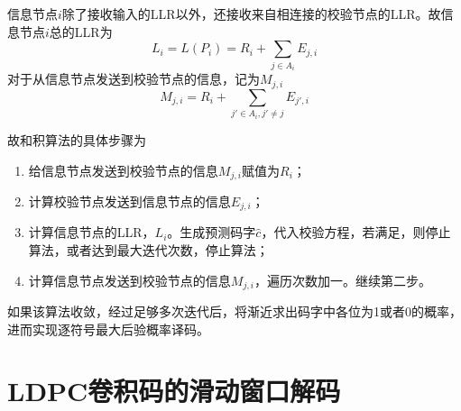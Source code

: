 信息节点$i$除了接收输入的LLR以外，还接收来自相连接的校验节点的LLR。故信息节点$i$总的LLR为
\begin{equation}
L_i = L(P_i) = R_i + \sum_{j\in A_i}E_{j,i}
\end{equation}
对于从信息节点发送到校验节点的信息，记为$M_{j,i}$
\begin{equation}
M_{j,i}= R_i + \sum_{j' \in A_i,j'\neq j}E_{j',i}
\end{equation}

故和积算法的具体步骤为
\begin{enumerate}
\item 给信息节点发送到校验节点的信息$M_{j,i}$赋值为$R_i$；
\item 计算校验节点发送到信息节点的信息$E_{j,i}$；
\item 计算信息节点的LLR，$L_i$。生成预测码字$\hat{c}$，代入校验方程，若满足，则停止算法，或者达到最大迭代次数，停止算法；
\item 计算信息节点发送到校验节点的信息$M_{j,i}$，遍历次数加一。继续第二步。
\end{enumerate}
如果该算法收敛，经过足够多次迭代后，将渐近求出码字中各位为1或者0的概率，进而实现逐符号最大后验概率译码。

\section{LDPC卷积码的滑动窗口解码}

